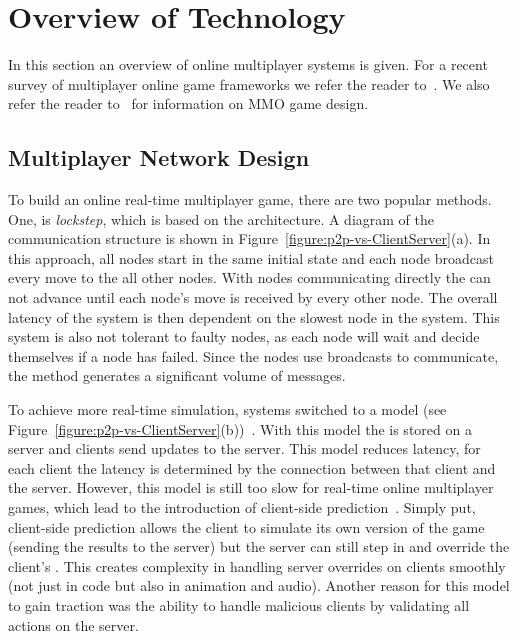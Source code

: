 
\section{Overview of Technology}

In this section an overview of online multiplayer systems is given. For a recent survey of multiplayer online game frameworks we refer the reader to~\cite{Yahyavi:2013:PAM:2522968.2522977}. We also refer the reader to~\cite{alexander2003massively} for information on MMO game design.

\subsection{Multiplayer Network Design}

To build an online real-time multiplayer game, there are two popular methods.
One, is \ptoP \emph{lockstep}, which is based on the \ptoP architecture.
A diagram of the \ptoP communication structure is shown in Figure~\ref{figure:p2p-vs-ClientServer}(a).
In this approach, all nodes start in the same initial state and each node broadcast every move to the all other nodes.
With nodes communicating directly the \gamestate can not advance until each node's move is received by every other node.
The overall latency of the system is then dependent on the slowest node in the system.
This system is also not tolerant to faulty nodes, as each node will wait and decide themselves if a node has failed.
Since the nodes use broadcasts to communicate, the method generates a significant volume of messages.

To achieve more real-time simulation, systems switched to a \clientServer model (see Figure~\ref{figure:p2p-vs-ClientServer}(b))~\cite{DOOMfaq}. 
With this model the \gamestate is stored on a server and clients send updates to the server.
This model reduces latency, for each client the latency is determined by the connection between that client and the server.
However, this model is still too slow for real-time online multiplayer games, which lead to the introduction of client-side prediction~\cite{bernier2001latency}.
Simply put, client-side prediction allows the client to simulate its own version of the game (sending the results to the server) but the server can still step in and override the client's \gamestate.
This creates complexity in handling server overrides on clients smoothly (not just in code but also in animation and audio).
Another reason for this model to gain traction was the ability to handle malicious clients by validating all actions on the server.


